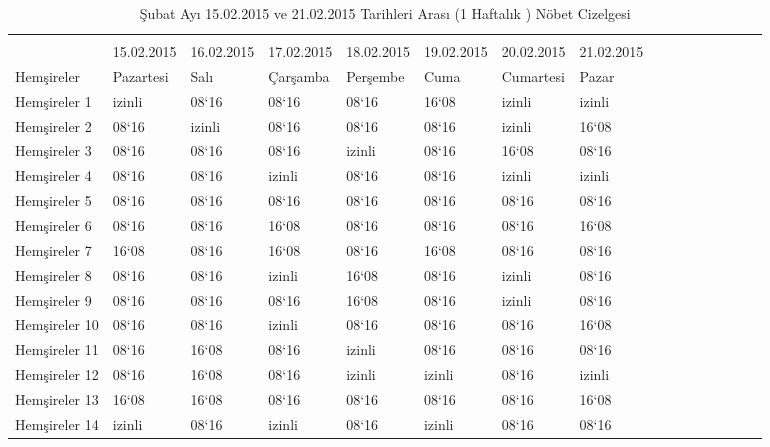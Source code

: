 \documentclass[12pt, a4paper]{article}
\begin{document}
\begin{flushleft}
\begin{center}
\begin{landscape}
		
		\begin{table}
			\caption{Şubat Ayı 15.02.2015 ve 21.02.2015  Tarihleri Arası (1 Haftalık ) Nöbet Cizelgesi}
			
			\begin{tabular}{|p{3cm}||p{2cm}||p{2cm}||p{3cm}||p{3cm}||p{3cm}||p{3cm}||p{2cm}|c|c|c|c|c|c|c|c|}
				\rowcolor{red}
				
				\hline \multicolumn{8}{|c|}{Şubat Ayı Hafta - 3} \\
				\rowcolor{yellow}
				\hline  & 15.02.2015 & 16.02.2015 & 17.02.2015 & 18.02.2015&19.02.2015&20.02.2015& 21.02.2015 \\
				\rowcolor{lightgray}
				
				\hline Hemşireler   & Pazartesi& Salı & Çarşamba & Perşembe &Cuma&Cumartesi &Pazar\\
				
				\hline Hemşireler 1 & izinli & 08`16  & 08`16  & 08`16 & 16`08 & izinli &  izinli \\
				\hline Hemşireler 2 & 08`16  &  izinli& 08`16  & 08`16 & 08`16 & izinli &  16`08 \\
				\hline Hemşireler 3 & 08`16  &  08`16 & 08`16  & izinli& 08`16 & 16`08  &  08`16 \\
				\hline Hemşireler 4 & 08`16  &  08`16 & izinli & 08`16 & 08`16 & izinli &  izinli \\
				\hline Hemşireler 5 & 08`16  &  08`16 & 08`16  & 08`16 & 08`16 & 08`16  &  08`16 \\
				\hline Hemşireler 6 & 08`16  &  08`16 & 16`08  & 08`16 & 08`16 & 08`16  &  16`08 \\
				\hline Hemşireler 7 & 16`08  &  08`16 & 16`08  & 08`16 & 16`08 & 08`16  &  08`16 \\
				\hline Hemşireler 8 & 08`16  &  08`16 & izinli & 16`08 & 08`16 & izinli &  08`16 \\
				\hline Hemşireler 9 & 08`16  &  08`16 & 08`16  & 16`08 & 08`16 & izinli &  08`16 \\
				\hline Hemşireler 10 & 08`16 &  08`16 & izinli & 08`16 & 08`16 & 08`16  &  16`08 \\
				\hline Hemşireler 11 & 08`16 &  16`08 & 08`16  & izinli& 08`16 & 08`16  &  08`16 \\
				\hline Hemşireler 12 & 08`16 &  16`08 & 08`16  & izinli& izinli& 08`16  &  izinli \\
				\hline Hemşireler 13 & 16`08 &  16`08 & 08`16  & 08`16 & 08`16 & 08`16  &  16`08 \\
				\hline Hemşireler 14 & izinli&  08`16 & izinli & 08`16 & izinli& 08`16  &  08`16 \\
				\hline
			\end{tabular}
			

\end{table}
\end{landscape}
\end{center}
\end{flushleft}
\end{document}
